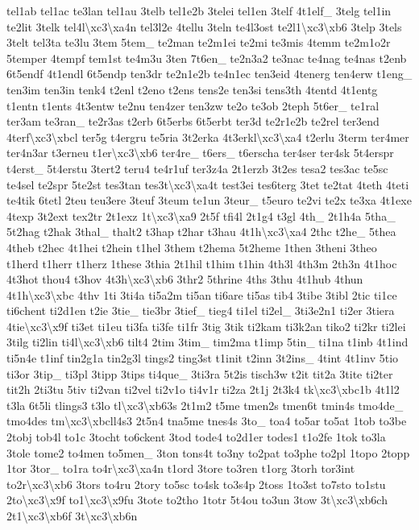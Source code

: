 {tel1ab tel1ac te3lan tel1au 3telb tel1e2b 3telei tel1en 3telf 4t1elf\-\_\- 3telg tel1in te2lit 3telk tel4l\textbackslash{}xc3\textbackslash{}xa4n tel3l2e 4tellu 3teln te4l3ost te2l1\textbackslash{}xc3\textbackslash{}xb6 3telp 3tels 3telt tel3ta te3lu 3tem 5tem\-\_\- te2man te2m1ei te2mi te3mis 4temm te2m1o2r 5temper 4tempf tem1st te4m3u 3ten 7t6en\-\_\- te2n3a2 te3nac te4nag te4nas t2enb 6t5endf 4t1endl 6t5endp ten3dr te2n1e2b te4n1ec ten3eid 4tenerg ten4erw t1eng\-\_\- ten3im ten3in tenk4 t2enl t2eno t2ens tens2e ten3si tens3th 4tentd 4t1entg t1entn t1ents 4t3entw te2nu ten4zer ten3zw te2o te3ob 2teph 5t6er\-\_\- te1ral ter3am te3ran\-\_\- te2r3as t2erb 6t5erbs 6t5erbt ter3d te2r1e2b te2rel ter3end 4terf\textbackslash{}xc3\textbackslash{}xbcl ter5g t4ergru te5ria 3t2erka 4t3erkl\textbackslash{}xc3\textbackslash{}xa4 t2erlu 3term ter4mer ter4n3ar t3erneu t1er\textbackslash{}xc3\textbackslash{}xb6 ter4re\-\_\- t6ers\-\_\- t6erscha ter4ser ter4sk 5t4erspr t4erst\-\_\- 5t4erstu 3tert2 teru4 te4r1uf ter3z4a 2t1erzb 3t2es tesa2 tes3ac te5sc te4sel te2spr 5te2st tes3tan tes3t\textbackslash{}xc3\textbackslash{}xa4t test3ei tes6terg 3tet te2tat 4teth 4teti te4tik 6tetl 2teu teu3ere 3teuf 3teum te1un 3teur\-\_\- t5euro te2vi te2x te3xa 4t1exe 4texp 3t2ext tex2tr 2t1exz 1t\textbackslash{}xc3\textbackslash{}xa9 2t5f tfi4l 2t1g4 t3gl 4th\-\_\- 2t1h4a 5tha\-\_\- 5t2hag t2hak 3thal\-\_\- thalt2 t3hap t2har t3hau 4t1h\textbackslash{}xc3\textbackslash{}xa4 2thc t2he\-\_\- 5thea 4theb t2hec 4t1hei t2hein t1hel 3them t2hema 5t2heme 1then 3theni 3theo t1herd t1herr t1herz 1these 3thia 2t1hil t1him t1hin 4th3l 4th3m 2th3n 4t1hoc 4t3hot thou4 t3hov 4t3h\textbackslash{}xc3\textbackslash{}xb6 3thr2 5thrine 4ths 3thu 4t1hub 4thun 4t1h\textbackslash{}xc3\textbackslash{}xbc 4thv 1ti 3ti4a ti5a2m ti5an ti6are ti5as tib4 3tibe 3tibl 2tic ti1ce ti6chent ti2d1en t2ie 3tie\-\_\- tie3br 3tief\-\_\- tieg4 ti1el ti2el\-\_\- 3ti3e2n1 ti2er 3tiera 4tie\textbackslash{}xc3\textbackslash{}x9f ti3et ti1eu ti3fa ti3fe ti1fr 3tig 3tik ti2kam ti3k2an tiko2 ti2kr ti2lei 3tilg ti2lin ti4l\textbackslash{}xc3\textbackslash{}xb6 tilt4 2tim 3tim\-\_\- tim2ma t1imp 5tin\-\_\- ti1na t1inb 4t1ind ti5n4e t1inf tin2g1a tin2g3l tings2 ting3st t1init t2inn 3t2ins\-\_\- 4tint 4t1inv 5tio ti3or 3tip\-\_\- ti3pl 3tipp 3tips ti4que\-\_\- 3ti3ra 5t2is tisch3w t2it tit2a 3tite ti2ter tit2h 2ti3tu 5tiv ti2van ti2vel ti2v1o ti4v1r ti2za 2t1j 2t3k4 tk\textbackslash{}xc3\textbackslash{}xbc1b 4t1l2 t3la 6t5li tlings3 t3lo tl\textbackslash{}xc3\textbackslash{}xb63s 2t1m2 t5me tmen2s tmen6t tmin4s tmo4de\-\_\- tmo4des tm\textbackslash{}xc3\textbackslash{}xbcll4s3 2t5n4 tna5me tnes4s 3to\-\_\- toa4 to5ar to5at 1tob to3be 2tobj tob4l to1c 3tocht to6ckent 3tod tode4 to2d1er todes1 t1o2fe 1tok to3la 3tole tome2 to4men to5men\-\_\- 3ton tons4t to3ny to2pat to3phe to2pl 1topo 2topp 1tor 3tor\-\_\- to1ra to4r\textbackslash{}xc3\textbackslash{}xa4n t1ord 3tore to3ren t1org 3torh tor3int to2r\textbackslash{}xc3\textbackslash{}xb6 3tors to4ru 2tory to5sc to4sk to3s4p 2toss 1to3st to7sto to1stu 2to\textbackslash{}xc3\textbackslash{}x9f to1\textbackslash{}xc3\textbackslash{}x9fu 3tote to2tho 1totr 5t4ou to3un 3tow 3t\textbackslash{}xc3\textbackslash{}xb6ch 2t1\textbackslash{}xc3\textbackslash{}xb6f 3t\textbackslash{}xc3\textbackslash{}xb6n }

